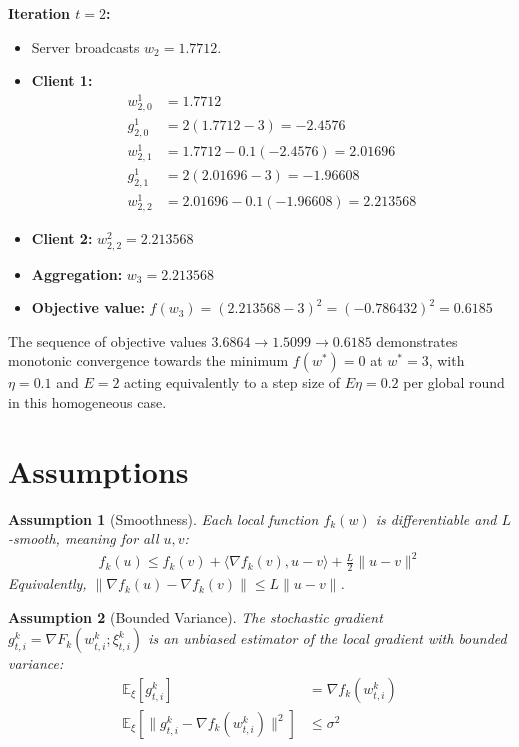 \documentclass{article}
\newtheorem{assumption}{Assumption}
\begin{document}
\textbf{Iteration $t=2$:}
\begin{itemize}
\item Server broadcasts $w_2 = 1.7712$.
\item \textbf{Client 1:}
\begin{align*}
w_{2,0}^1 &= 1.7712 \\
g_{2,0}^1 &= 2(1.7712 - 3) = -2.4576 \\
w_{2,1}^1 &= 1.7712 - 0.1(-2.4576) = 2.01696 \\
g_{2,1}^1 &= 2(2.01696 - 3) = -1.96608 \\
w_{2,2}^1 &= 2.01696 - 0.1(-1.96608) = 2.213568
\end{align*}
\item \textbf{Client 2:} $w_{2,2}^2 = 2.213568$
\item \textbf{Aggregation:} $w_3 = 2.213568$
\item \textbf{Objective value:} $f(w_3) = (2.213568 - 3)^2 = (-0.786432)^2 = 0.6185$
\end{itemize}
The sequence of objective values $3.6864 \to 1.5099 \to 0.6185$ demonstrates monotonic convergence towards the minimum $f(w^*) = 0$ at $w^* = 3$, with $\eta=0.1$ and $E=2$ acting equivalently to a step size of $E\eta = 0.2$ per global round in this homogeneous case.

\section*{Assumptions}
\begin{assumption}[Smoothness]
Each local function $f_k(w)$ is differentiable and $L$-smooth, meaning for all $u, v$:
\begin{align*}
f_k(u) \leq f_k(v) + \langle \nabla f_k(v), u - v \rangle + \frac{L}{2} \|u - v\|^2
\end{align*}
Equivalently, $\|\nabla f_k(u) - \nabla f_k(v)\| \leq L \|u - v\|$.
\end{assumption}

\begin{assumption}[Bounded Variance]
The stochastic gradient $g_{t,i}^k = \nabla F_k(w_{t,i}^k; \xi_{t,i}^k)$ is an unbiased estimator of the local gradient with bounded variance:
\begin{align*}
\mathbb{E}_{\xi}[g_{t,i}^k] &= \nabla f_k(w_{t,i}^k) \\
\mathbb{E}_{\xi}[\|g_{t,i}^k - \nabla f_k(w_{t,i}^k)\|^2] &\leq \sigma^2
\end{align*}
\end{assumption}
\end{document}
